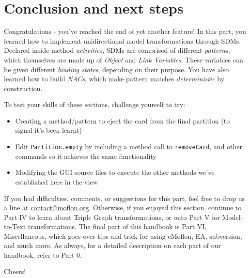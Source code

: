 \genHeader
\section{Conclusion and next steps}
\hypertarget{conclusion}{}

\vspace{0.5cm}

Congratulations - you've reached the end of yet another feature! In this part, you learned how to implement unidirectional model transformations through SDMs.
Declared inside method \emph{activities}, SDMs are comprised of different \emph{pattern}s, which themselves are made up of \emph{Object} and \emph{Link
Variables}. These variables can be given different \emph{binding states}, depending on their purpose. You have also learned how to build \emph{NACs}, which make
pattern matches \emph{deterministic} by construction.

\vspace{0.5cm}

To test your skills of these sections, challenge yourself to try:
\begin{itemize}
\item Creating a method/pattern to eject the card from the final partition (to signal it's been learnt)
\item Edit \texttt{Partition.empty} by including a method call to \texttt{removeCard}, and other commands so it achieves the same functionality
\item Modifying the GUI source files to execute the other methods we've established here in the view
\end{itemize}

\vspace{0.5cm}
	
If you had difficulties, comments, or suggestions for this part, feel free to drop us a line at \href{mailto:contact@moflon.org}{contact@moflon.org}.
Otherwise, if you enjoyed this section, continue to Part IV to learn about Triple Graph transformations, or onto Part V for Model-to-Text transformations. The
final part of this handbook is Part VI, Miscellaneous, which goes over tips and trick for using eMoflon, EA, subversion, and much more. As always, for a detailed description on each part of our handbook, refer to Part 0.

\vspace{0.5cm}


Cheers!
